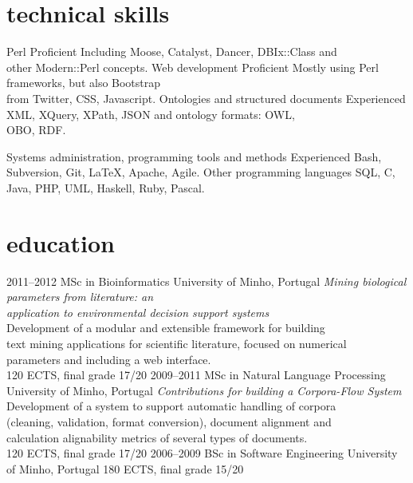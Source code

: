 \documentclass[a4paper]{friggeri-cv}
\begin{document}
\section{technical skills}
\begin{entrylist}
	\entry
		{}
		{Perl}
		{Proficient}
		{Including Moose, Catalyst, Dancer, DBIx::Class and\\
		other Modern::Perl concepts.}
	\entry
		{}
		{Web development}
		{Proficient}
		{Mostly using Perl frameworks, but also Bootstrap\\
		from Twitter, CSS, Javascript.}
	\entry
		{}
		{Ontologies and structured documents}
		{Experienced}
		{XML, XQuery, XPath, JSON and ontology formats: OWL,\\
		OBO, RDF.}
\end{entrylist}
\begin{entrylist}
	\entry
		{}
		{Systems administration, programming tools and methods}
		{Experienced}
		{Bash, Subversion, Git, \LaTeX, Apache, Agile.}
	\entry
		{}
		{Other programming languages}
		{}
		{SQL, C, Java, PHP, UML, Haskell, Ruby, Pascal.}
\end{entrylist}

\newpage
\section{education}

\begin{entrylist}
  \entry
    {2011--2012}
    {MSc in Bioinformatics}
    {University of Minho, Portugal}
    {\emph{Mining biological parameters from literature: an\\
	application to environmental decision support systems}\\
	{\footnotesize{Development of a modular and extensible framework
	for building\\
	text mining applications for scientific literature, focused on
	numerical\\ 
	parameters and including a web interface.}}\\
    120 ECTS, final grade 17/20
	}
  \entry
    {2009--2011}
    {MSc in Natural Language Processing}
    {University of Minho, Portugal}
    {\emph{Contributions for building a Corpora-Flow System}\\
	{\footnotesize{Development of a system to support automatic handling of corpora\\
	(cleaning, validation, format conversion), document alignment and\\
	calculation alignability metrics of several types of documents.}}\\
    120 ECTS, final grade 17/20
	}
  \entry
    {2006--2009}
    {BSc in Software Engineering}
    {University of Minho, Portugal}
    {180 ECTS, final grade 15/20}
\end{entrylist}
\end{document}
